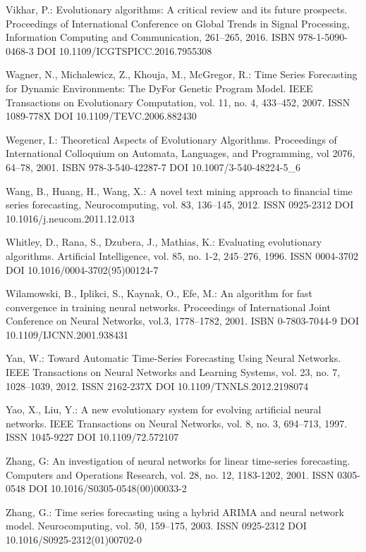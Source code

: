 \begin{thebibliography}{99.}
 Vikhar, P.: Evolutionary algorithms: A critical review and its future prospects. Proceedings of International Conference on Global Trends in Signal Processing, Information Computing and Communication, 261--265, 2016. ISBN 978-1-5090-0468-3 DOI 10.1109/ICGTSPICC.2016.7955308

 Wagner, N., Michalewicz, Z., Khouja, M., McGregor, R.: Time Series Forecasting for Dynamic Environments: The DyFor Genetic Program Model. IEEE Transactions on Evolutionary Computation, vol. 11, no. 4, 433--452, 2007. ISSN 1089-778X DOI 10.1109/TEVC.2006.882430

 Wegener, I.: Theoretical Aspects of Evolutionary Algorithms. Proceedings of International Colloquium on Automata, Languages, and Programming, vol 2076, 64--78, 2001. ISBN 978-3-540-42287-7 DOI 10.1007/3-540-48224-5\_6

 Wang, B., Huang, H., Wang, X.: A novel text mining approach to financial time series forecasting, Neurocomputing, vol. 83, 136--145, 2012. ISSN 0925-2312 DOI 10.1016/j.neucom.2011.12.013

 Whitley, D., Rana, S., Dzubera, J., Mathias, K.: Evaluating evolutionary algorithms. Artificial Intelligence, vol. 85, no. 1-2, 245--276, 1996. ISSN 0004-3702 DOI 10.1016/0004-3702(95)00124-7

 Wilamowski, B., Iplikci, S., Kaynak, O., Efe, M.: An algorithm for fast convergence in training neural networks. Proceedings of International Joint Conference on Neural Networks, vol.3, 1778--1782, 2001. ISBN 0-7803-7044-9 DOI 10.1109/IJCNN.2001.938431

 Yan, W.: Toward Automatic Time-Series Forecasting Using Neural Networks. IEEE Transactions on Neural Networks and Learning Systems, vol. 23, no. 7, 1028--1039, 2012. ISSN 2162-237X DOI 10.1109/TNNLS.2012.2198074

 Yao, X., Liu, Y.: A new evolutionary system for evolving artificial neural networks. IEEE Transactions on Neural Networks, vol. 8, no. 3, 694--713, 1997. ISSN 1045-9227 DOI 10.1109/72.572107

 Zhang, G: An investigation of neural networks for linear time-series forecasting. Computers and Operations Research, vol. 28, no. 12, 1183-1202, 2001. ISSN 0305-0548 DOI 10.1016/S0305-0548(00)00033-2

 Zhang, G.: Time series forecasting using a hybrid ARIMA and neural network model. Neurocomputing, vol. 50, 159--175, 2003. ISSN 0925-2312 DOI 10.1016/S0925-2312(01)00702-0


\end{thebibliography}
